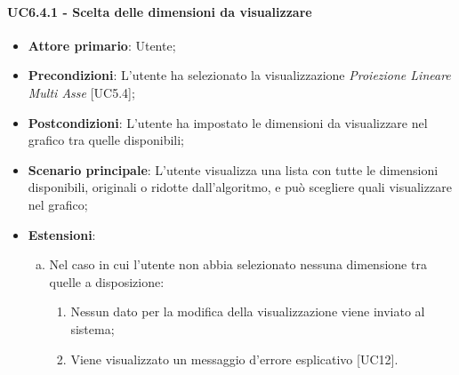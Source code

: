 \paragraph{UC6.4.1 - Scelta delle dimensioni da visualizzare}
\begin{itemize}
	\item \textbf{Attore primario}: Utente;
	\item \textbf{Precondizioni}: L'utente ha selezionato la visualizzazione \textit{Proiezione Lineare Multi Asse} [UC5.4];
	\item \textbf{Postcondizioni}: L'utente ha impostato le dimensioni da visualizzare nel grafico tra quelle disponibili;
	
	\item \textbf{Scenario principale}: L'utente visualizza una lista con tutte le dimensioni disponibili, originali o ridotte dall'algoritmo, e può scegliere quali visualizzare nel grafico;
	
	\item \textbf{Estensioni}:
	\begin{enumerate}[(a)]
		\item Nel caso in cui l'utente non abbia selezionato nessuna dimensione tra quelle a disposizione:
		\begin{enumerate}[1.]
			\item Nessun dato per la modifica della visualizzazione viene inviato al sistema;
			\item Viene visualizzato un messaggio d'errore esplicativo [UC12].
		\end{enumerate}
	\end{enumerate}
\end{itemize}